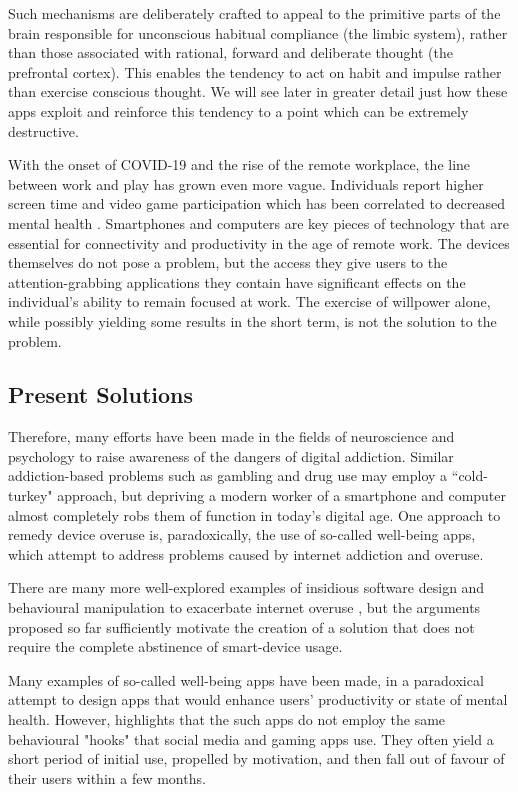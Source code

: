 Such mechanisms are deliberately crafted to appeal to the primitive parts of the brain responsible for unconscious habitual compliance (the limbic system), rather than those associated with rational, forward and deliberate thought (the prefrontal cortex). This enables the tendency to act on habit and impulse rather than exercise conscious thought. We will see later in greater detail just how these apps exploit and reinforce this tendency to a point which can be extremely destructive.

With the onset of COVID-19 and the rise of the remote workplace, the line between work and play has grown even more vague. Individuals report higher screen time and video game participation which has been correlated to decreased mental health \cite{colley2020exercise}. Smartphones and computers are key pieces of technology that are essential for connectivity and productivity in the age of remote work. The devices themselves do not pose a problem, but the access they give users to the attention-grabbing applications they contain have significant effects on the individual's ability to remain focused at work. The exercise of willpower alone, while possibly yielding some results in the short term, is not the solution to the problem.

\subsection{Present Solutions}
Therefore, many efforts have been made in the fields of neuroscience and psychology to raise awareness of the dangers of digital addiction. Similar addiction-based problems such as gambling and drug use may employ a ``cold-turkey" approach, but depriving a modern worker of a smartphone and computer almost completely robs them of function in today's digital age. One approach to remedy device overuse is, paradoxically, the use of so-called well-being apps, which attempt to address problems caused by internet addiction and overuse.

There are many more well-explored examples of insidious software design and behavioural manipulation to exacerbate internet overuse \cite{sagePaper2020}, but the arguments proposed so far sufficiently motivate the creation of a solution that does not require the complete abstinence of smart-device usage.

Many examples of so-called well-being apps have been made, in a paradoxical attempt to design apps that would enhance users' productivity or state of mental health. However, \cite{sagePaper2020} highlights that the such apps do not employ the same behavioural "hooks" that social media and gaming apps use. They often yield a short period of initial use, propelled by motivation, and then fall out of favour of their users within a few months.

